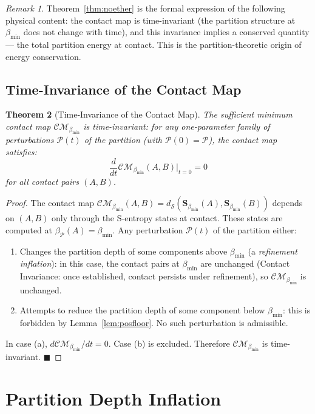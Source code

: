\documentclass[12pt, a4paper]{article}
\theoremstyle{plain}
\newtheorem{theorem}{Theorem}[section]
\theoremstyle{definition}
\theoremstyle{remark}
\newtheorem{remark}[theorem]{Remark}
\newcommand{\bmin}{\beta_{\min}}
\newcommand{\CM}{\mathcal{CM}}
\newcommand{\dS}{d_{\mathcal{S}}}
\newcommand{\Pcal}{\mathcal{P}}
\newcommand{\qed}{\hfill$\blacksquare$}
\begin{document}
\begin{remark}
Theorem~\ref{thm:noether} is the formal expression of the following physical
content: the contact map is time-invariant (the partition structure at $\bmin$
does not change with time), and this invariance implies a conserved quantity
--- the total partition energy at contact. This is the partition-theoretic origin
of energy conservation.
\end{remark}

\subsection{Time-Invariance of the Contact Map}
\label{sec:time_invariance}

\begin{theorem}[Time-Invariance of the Contact Map]
\label{thm:time_invariance}
The sufficient minimum contact map $\CM_{\bmin}$ is time-invariant: for any
one-parameter family of perturbations $\Pcal(t)$ of the partition (with
$\Pcal(0) = \Pcal$), the contact map satisfies:
\[
  \frac{d}{dt}\CM_{\bmin}(A,B)\big|_{t=0} = 0
\]
for all contact pairs $(A,B)$.
\end{theorem}

\begin{proof}
The contact map $\CM_{\bmin}(A,B) = \dS(\mathbf{S}_{\bmin}(A), \mathbf{S}_{\bmin}(B))$
depends on $(A,B)$ only through the S-entropy states at contact. These states
are computed at $\beta_\Pcal(A) = \bmin$. Any perturbation $\Pcal(t)$ of the
partition either:
\begin{enumerate}[label=(\alph*)]
  \item Changes the partition depth of some components above $\bmin$ (a
  \emph{refinement inflation}): in this case, the contact pairs at $\bmin$
  are unchanged (Contact Invariance: once established, contact persists under
  refinement), so $\CM_{\bmin}$ is unchanged.
  \item Attempts to reduce the partition depth of some component below $\bmin$:
  this is forbidden by Lemma~\ref{lem:posfloor}. No such perturbation is
  admissible.
\end{enumerate}
In case (a), $d\CM_{\bmin}/dt = 0$. Case (b) is excluded. Therefore
$\CM_{\bmin}$ is time-invariant. \qed
\end{proof}

\section{Partition Depth Inflation}
\label{sec:classification}
\end{document}
